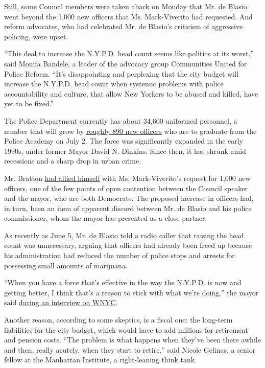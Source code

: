 Still, some Council members were taken aback on Monday that Mr. de
Blasio went beyond the 1,000 new officers that Ms. Mark-Viverito had
requested. And reform advocates, who had celebrated Mr. de Blasio's
criticism of aggressive policing, were upset.

``This deal to increase the N.Y.P.D. head count seems like politics at
its worst,'' said Monifa Bandele, a leader of the advocacy group
Communities United for Police Reform. ``It's disappointing and
perplexing that the city budget will increase the N.Y.P.D. head count
when systemic problems with police accountability and culture, that
allow New Yorkers to be abused and killed, have yet to be fixed.''

The Police Department currently has about 34,600 uniformed personnel, a
number that will grow by
\href{http://www.nypdnews.com/2015/01/new-class-of-891-police-academy.html}{roughly
890 new officers} who are to graduate from the Police Academy on July 2.
The force was significantly expanded in the early 1990s, under former
Mayor David N. Dinkins. Since then, it has shrunk amid recessions and a
sharp drop in urban crime.

Mr. Bratton
\href{http://www.nytimes3xbfgragh.onion/2015/04/16/nyregion/city-council-speaker-draws-ire-of-allies-on-police-hiring.html}{had
allied himself} with Ms. Mark-Viverito's request for 1,000 new officers,
one of the few points of open contention between the Council speaker and
the mayor, who are both Democrats. The proposed increase in officers
had, in turn, been an item of apparent discord between Mr. de Blasio and
his police commissioner, whom the mayor has presented as a close
partner.

As recently as June 5, Mr. de Blasio told a radio caller that raising
the head count was unnecessary, arguing that officers had already been
freed up because his administration had reduced the number of police
stops and arrests for possessing small amounts of marijuana.

``When you have a force that's effective in the way the N.Y.P.D. is now
and getting better, I think that's a reason to stick with what we're
doing,'' the mayor said
\href{http://www.wnyc.org/story/second-summer-sit-down-mayor/}{during an
interview on WNYC}.

Another reason, according to some skeptics, is a fiscal one: the
long-term liabilities for the city budget, which would have to add
millions for retirement and pension costs. ``The problem is what happens
when they've been there awhile and then, really acutely, when they start
to retire,'' said Nicole Gelinas, a senior fellow at the Manhattan
Institute, a right-leaning think tank.


